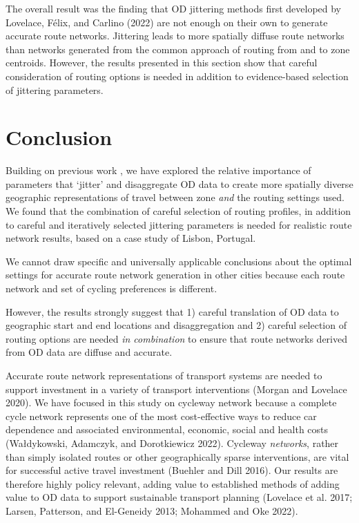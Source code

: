 \documentclass{isprs} %
\begin{document}
The overall result was the finding that OD jittering methods first developed by Lovelace, Félix, and Carlino (2022) are not enough on their own to generate accurate route networks.
Jittering leads to more spatially diffuse route networks than networks generated from the common approach of routing from and to zone centroids.
However, the results presented in this section show that careful consideration of routing options is needed in addition to evidence-based selection of jittering parameters.

\hypertarget{conclusion}{%
\section{Conclusion}\label{conclusion}}

Building on previous work , we have explored the relative importance of parameters that `jitter' and disaggregate OD data to create more spatially diverse geographic representations of travel between zone \emph{and} the routing settings used.
We found that the combination of careful selection of routing profiles, in addition to careful and iteratively selected jittering parameters is needed for realistic route network results, based on a case study of Lisbon, Portugal.

We cannot draw specific and universally applicable conclusions about the optimal settings for accurate route network generation in other cities because each route network and set of cycling preferences is different.

However, the results strongly suggest that 1) careful translation of OD data to geographic start and end locations and disaggregation and 2) careful selection of routing options are needed \emph{in combination} to ensure that route networks derived from OD data are diffuse and accurate.

Accurate route network representations of transport systems are needed to support investment in a variety of transport interventions (Morgan and Lovelace 2020).
We have focused in this study on cycleway network because a complete cycle network represents one of the most cost-effective ways to reduce car dependence and associated environmental, economic, social and health costs (Wałdykowski, Adamczyk, and Dorotkiewicz 2022).
Cycleway \emph{networks}, rather than simply isolated routes or other geographically sparse interventions, are vital for successful active travel investment (Buehler and Dill 2016).
Our results are therefore highly policy relevant, adding value to established methods of adding value to OD data to support sustainable transport planning (Lovelace et al. 2017; Larsen, Patterson, and El-Geneidy 2013; Mohammed and Oke 2022).
\end{document}
